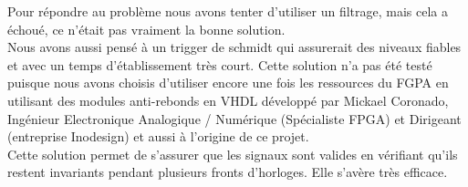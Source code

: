 	Pour répondre au problème nous avons tenter d'utiliser un filtrage, mais cela a échoué, ce n'était pas vraiment la bonne solution.\\
	Nous avons aussi pensé à un trigger de schmidt qui assurerait des niveaux fiables et avec un temps d'établissement très court. Cette solution n'a pas été testé puisque nous avons choisis d'utiliser encore une fois les ressources du FGPA en utilisant des modules anti-rebonds en VHDL développé par Mickael Coronado, Ingénieur Electronique Analogique / Numérique (Spécialiste FPGA) et Dirigeant (entreprise Inodesign) et aussi à l'origine de ce projet.\\
	
	Cette solution permet de s'assurer que les signaux sont valides en vérifiant qu'ils restent invariants pendant plusieurs fronts d'horloges. Elle s'avère très efficace.\\